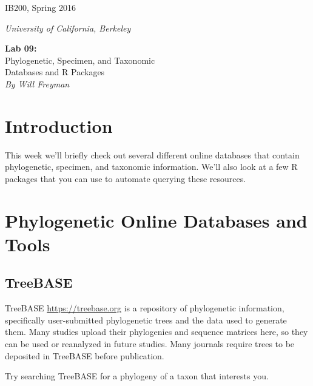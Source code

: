\documentclass[11pt]{article}
\begin{document}
\noindent
\large
\begin{minipage}{0.5\textwidth}
\begin{flushleft} 
IB200, Spring 2016
\end{flushleft}
\end{minipage}
\begin{minipage}{0.5\textwidth}
\begin{flushright} 
\textit{University of California, Berkeley}
\end{flushright}
\end{minipage}

\vspace{0.5cm}


\begin{center}
\Large \textbf{Lab 09:} \\
Phylogenetic, Specimen, and Taxonomic \\
Databases and R Packages \\
\normalsize
\textit{By Will Freyman}
\end{center}

\vspace{0.5cm}


\section{Introduction}

This week we'll briefly check out several different online databases
that contain phylogenetic, specimen, and taxonomic information.
We'll also look at a few R packages that you can use to automate
querying these resources.

\section{Phylogenetic Online Databases and Tools}

\subsection{TreeBASE}

TreeBASE \url{https://treebase.org} is a repository of phylogenetic information, 
specifically user-submitted phylogenetic trees and the data used to generate them.
Many studies upload their phylogenies and sequence matrices here,
so they can be used or reanalyzed in future studies.
Many journals require trees to be deposited in TreeBASE before publication.

Try searching TreeBASE for a phylogeny of a taxon that interests you.
\end{document}
